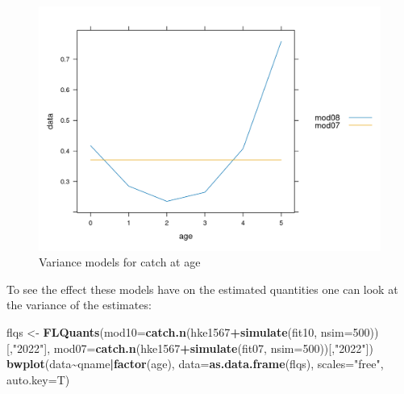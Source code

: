 \documentclass[
]{book}
\newenvironment{Shaded}{\begin{snugshade}}{\end{snugshade}}
\newcommand{\AttributeTok}[1]{\textcolor[rgb]{0.13,0.29,0.53}{#1}}
\newcommand{\DecValTok}[1]{\textcolor[rgb]{0.00,0.00,0.81}{#1}}
\newcommand{\FunctionTok}[1]{\textcolor[rgb]{0.13,0.29,0.53}{\textbf{#1}}}
\newcommand{\NormalTok}[1]{#1}
\newcommand{\OtherTok}[1]{\textcolor[rgb]{0.56,0.35,0.01}{#1}}
\newcommand{\SpecialCharTok}[1]{\textcolor[rgb]{0.81,0.36,0.00}{\textbf{#1}}}
\newcommand{\StringTok}[1]{\textcolor[rgb]{0.31,0.60,0.02}{#1}}
\begin{document}
\begin{figure}
\centering
\includegraphics{_bookdown_files/_main_files/figure-html/vagepredbyage-1.png}
\caption{\label{fig:vagepredbyage}Variance models for catch at age}
\end{figure}

To see the effect these models have on the estimated quantities one can look at the variance of the estimates:

\begin{Shaded}
\begin{Highlighting}[]
\NormalTok{flqs }\OtherTok{\textless{}{-}} \FunctionTok{FLQuants}\NormalTok{(}\AttributeTok{mod10=}\FunctionTok{catch.n}\NormalTok{(hke1567}\SpecialCharTok{+}\FunctionTok{simulate}\NormalTok{(fit10, }\AttributeTok{nsim=}\DecValTok{500}\NormalTok{))[,}\StringTok{"2022"}\NormalTok{], }\AttributeTok{mod07=}\FunctionTok{catch.n}\NormalTok{(hke1567}\SpecialCharTok{+}\FunctionTok{simulate}\NormalTok{(fit07, }\AttributeTok{nsim=}\DecValTok{500}\NormalTok{))[,}\StringTok{"2022"}\NormalTok{])}
\FunctionTok{bwplot}\NormalTok{(data}\SpecialCharTok{\textasciitilde{}}\NormalTok{qname}\SpecialCharTok{|}\FunctionTok{factor}\NormalTok{(age),  }\AttributeTok{data=}\FunctionTok{as.data.frame}\NormalTok{(flqs), }\AttributeTok{scales=}\StringTok{"free"}\NormalTok{, }\AttributeTok{auto.key=}\NormalTok{T)}
\end{Highlighting}
\end{Shaded}
\end{document}
